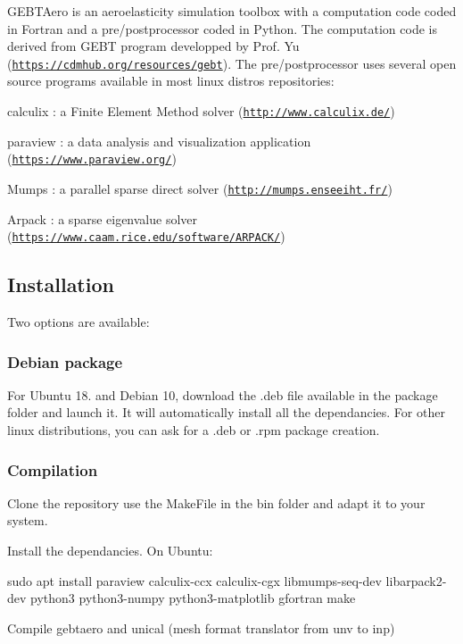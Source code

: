 G\+E\+B\+T\+Aero is an aeroelasticity simulation toolbox with a computation code coded in Fortran and a pre/postprocessor coded in Python. The computation code is derived from G\+E\+BT program developped by Prof. Yu (\href{https://cdmhub.org/resources/gebt}{\tt https\+://cdmhub.\+org/resources/gebt}). The pre/postprocessor uses several open source programs available in most linux distros repositories\+:
\begin{DoxyItemize}
\item calculix \+: a Finite Element Method solver (\href{http://www.calculix.de/}{\tt http\+://www.\+calculix.\+de/})
\item paraview \+: a data analysis and visualization application (\href{https://www.paraview.org/}{\tt https\+://www.\+paraview.\+org/})
\item Mumps \+: a parallel sparse direct solver (\href{http://mumps.enseeiht.fr/}{\tt http\+://mumps.\+enseeiht.\+fr/})
\item Arpack \+: a sparse eigenvalue solver (\href{https://www.caam.rice.edu/software/ARPACK/}{\tt https\+://www.\+caam.\+rice.\+edu/software/\+A\+R\+P\+A\+C\+K/})
\end{DoxyItemize}

\subsection*{Installation}

Two options are available\+:

\subsubsection*{Debian package}

For Ubuntu 18. and Debian 10, download the .deb file available in the package folder and launch it. It will automatically install all the dependancies. For other linux distributions, you can ask for a .deb or .rpm package creation.

\subsubsection*{Compilation}

Clone the repository use the Make\+File in the bin folder and adapt it to your system.

Install the dependancies. On Ubuntu\+: 
\begin{DoxyCode}
sudo apt install paraview calculix-ccx calculix-cgx libmumps-seq-dev libarpack2-dev python3 python3-numpy
       python3-matplotlib gfortran make
\end{DoxyCode}
 Compile gebtaero and unical (mesh format translator from unv to inp)

